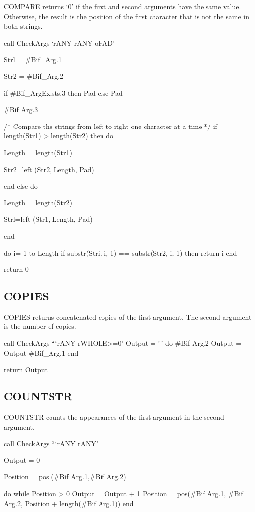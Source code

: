 COMPARE returns `0' if the first and second arguments have the same
value. Otherwise, the result is the position of the first character that
is not the same in both strings.

call CheckArgs `rANY rANY oPAD'

Strl = \#Bif\_Arg.1

Str2 = \#Bif\_Arg.2

if \#Bif\_ArgExists.3 then Pad else Pad

\#Bif Arg.3

/* Compare the strings from left to right one character at a time */ if
length(Str1) \textgreater{} length(Str2) then do

Length = length(Str1)

Str2=left (Str2, Length, Pad)

end else do

Length = length(Str2)

Strl=left (Str1, Length, Pad)

end

do i= 1 to Length if substr(Stri, i, 1) == substr(Str2, i, 1) then
return i end

return 0

\hypertarget{copies}{%
\subsection{COPIES}\label{copies}}

COPIES returns concatenated copies of the first argument. The second
argument is the number of copies.

call CheckArgs ```rANY rWHOLE\textgreater=0' Output = '\,' do \#Bif
Arg.2 Output = Output \textbar\textbar{} \#Bif\_Arg.1 end

return Output

\hypertarget{countstr}{%
\subsection{COUNTSTR}\label{countstr}}

COUNTSTR counts the appearances of the first argument in the second
argument.

call CheckArgs ```rANY rANY'

Output = 0

Position = pos (\#Bif Arg.1,\#Bif Arg.2)

do while Position \textgreater{} 0 Output = Output + 1 Position =
pos(\#Bif Arg.1, \#Bif Arg.2, Position + length(\#Bif Arg.1)) end

